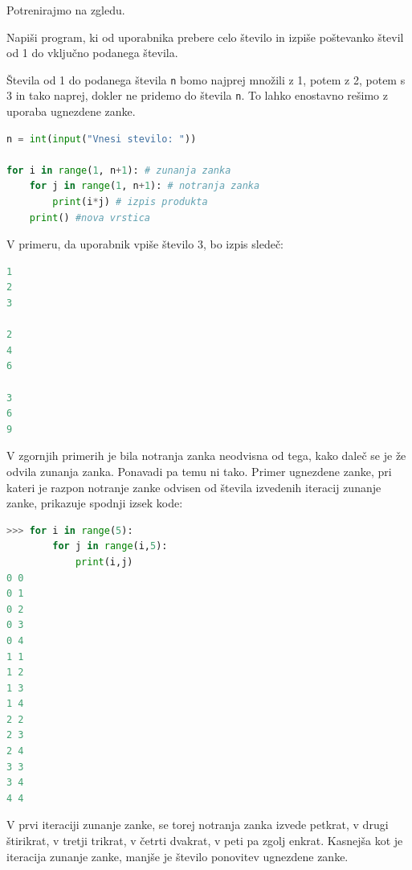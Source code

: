 Potrenirajmo na zgledu.

\begin{zgled}
Napiši program, ki od uporabnika prebere celo število in izpiše poštevanko števil od 1 do vključno podanega števila.
\end{zgled}
\begin{resitev}
Števila od 1 do podanega števila \texttt{n} bomo najprej množili z 1, potem z 2, potem s 3 in tako naprej, dokler ne pridemo do števila \texttt{n}. To lahko enostavno rešimo z uporaba ugnezdene zanke.
\begin{lstlisting}[language=Python, showstringspaces=false]
n = int(input("Vnesi stevilo: "))

for i in range(1, n+1): # zunanja zanka
    for j in range(1, n+1): # notranja zanka
        print(i*j) # izpis produkta
    print() #nova vrstica
\end{lstlisting}
V primeru, da uporabnik vpiše število 3, bo izpis sledeč:
\begin{lstlisting}[language=Python, showstringspaces=false]
1
2
3

2
4
6

3
6
9
\end{lstlisting}
\end{resitev}

V zgornjih primerih je bila notranja zanka neodvisna od tega, kako daleč se je že odvila zunanja zanka. Ponavadi pa temu ni tako. Primer ugnezdene zanke, pri kateri je razpon notranje zanke odvisen od števila izvedenih iteracij zunanje zanke, prikazuje spodnji izsek kode:
\begin{lstlisting}[language=Python, showstringspaces=false]
>>> for i in range(5):
        for j in range(i,5):
            print(i,j)
0 0
0 1
0 2
0 3
0 4
1 1
1 2
1 3
1 4
2 2
2 3
2 4
3 3
3 4
4 4
\end{lstlisting}
V prvi iteraciji zunanje zanke, se torej notranja zanka izvede petkrat, v drugi štirikrat, v tretji trikrat, v četrti dvakrat, v peti pa zgolj enkrat. Kasnejša kot je iteracija zunanje zanke, manjše je število ponovitev ugnezdene zanke. 

